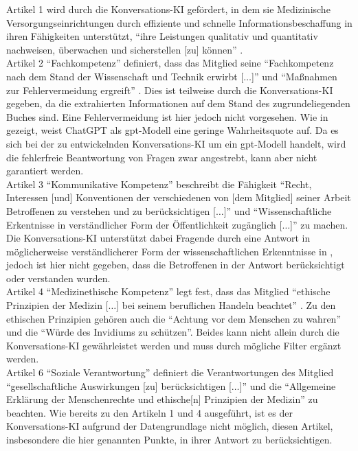 Artikel 1 wird durch die Konversations-KI gefördert, in dem sie Medizinische Versorgungseinrichtungen durch effiziente und schnelle Informationsbeschaffung in ihren Fähigkeiten unterstützt,
\enquote{ihre Leistungen qualitativ und quantitativ nachweisen, überwachen und sicherstellen [zu] können} \citep{gmds_eth}.\\

Artikel 2 \enquote{Fachkompetenz} definiert, dass das Mitglied seine \enquote{Fachkompetenz nach dem Stand der Wissenschaft und Technik erwirbt [$\dots$]} und \enquote{Maßnahmen zur Fehlervermeidung ergreift} \citep{gmds_eth}.
Dies ist teilweise durch die Konversations-KI gegeben, da die extrahierten Informationen auf dem Stand des zugrundeliegenden Buches \citet{bb} sind.
Eine Fehlervermeidung ist hier jedoch nicht vorgesehen.
Wie in \citet{chatgpt_qas} gezeigt, weist ChatGPT als \ac{gpt}-Modell eine geringe Wahrheitsquote auf.
Da es sich bei der zu entwickelnden Konversations-KI um ein \ac{gpt}-Modell handelt, wird die fehlerfreie Beantwortung von Fragen zwar angestrebt, kann aber nicht garantiert werden.\\

Artikel 3 \enquote{Kommunikative Kompetenz} beschreibt die Fähigkeit
\enquote{Recht, Interessen [und] Konventionen der verschiedenen von [dem Mitglied] seiner Arbeit Betroffenen zu verstehen und zu berücksichtigen [$\dots$]} und
\enquote{Wissenschaftliche Erkentnisse in verständlicher Form der Öffentlichkeit zugänglich [$\dots$]} \citep{gmds_eth} zu machen.
Die Konversations-KI unterstützt dabei Fragende durch eine Antwort in möglicherweise verständlicherer Form der wissenschaftlichen Erkenntnisse in \citet{bb},
jedoch ist hier nicht gegeben, dass die Betroffenen in der Antwort berücksichtigt oder verstanden wurden.\\

Artikel 4 \enquote{Medizinethische Kompetenz} legt fest, dass das Mitglied
\enquote{ethische Prinzipien der Medizin [$\dots$] bei seinem beruflichen Handeln beachtet} \citep{gmds_eth}.
Zu den ethischen Prinzipien \citep{gmds_eth} gehören auch die \enquote{Achtung vor dem Menschen zu wahren} und die \enquote{Würde des Invidiums zu schützen}.
Beides kann nicht allein durch die Konversations-KI gewährleistet werden und muss durch mögliche Filter ergänzt werden.\\

Artikel 6 \enquote{Soziale Verantwortung} definiert die Verantwortungen des Mitglied
\enquote{gesellschaftliche Auswirkungen [zu] berücksichtigen [$\dots$]} und die
\enquote{Allgemeine Erklärung der Menschenrechte und ethische[n] Prinzipien der Medizin} \citep{gmds_eth}zu beachten.
Wie bereits zu den Artikeln 1 und 4 ausgeführt, ist es der Konversations-KI aufgrund der Datengrundlage nicht möglich, diesen Artikel, insbesondere die hier genannten Punkte, in ihrer Antwort zu berücksichtigen.\\

